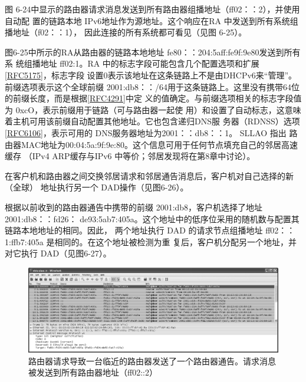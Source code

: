 图 6-24中显示的路由器请求消息发送到所有路由器组播地址（ff02：：2），并使用自动配
置的链路本地 IPv6地址作为源地址。这个响应在RA 中发送到所有系统组播地址（f02：：1），
因此连接的所有系统都可看见（见图 6-25）。

图6-25中所示的RA从路由器的链路本地地址 fe80：：204:5aff:fe9f:9e80发送到所有系
统组播地址 ff02:1。RA
中的标志字段可能包含几个配置选项和扩展\href{https://www.rfc-editor.org/rfc/rfc5175}{\href{https://www.rfc-editor.org/rfc/rfc5175}{[RFC5175]}}，标志字段
设置0表示该地址在这条链路上不是由DHCPv6来“管理”。前缀选项表示这个全球前缀
2001:db8：：/64用于这条链路上。这里没有携带64位的前缀长度，而是根据\href{https://www.rfc-editor.org/rfc/rfc4291}{\href{https://www.rfc-editor.org/rfc/rfc4291}{[RFC4291]}}中定
义的值确定。与前缀选项相关的标志字段值为 0xcO，表示前缀用于链路（可与路由器一起使
用）和设置了自动标志，这意味着主机可用该前缀自动配置其他地址。它也包含递归DNS服
务器（RDNSS）选项\href{https://www.rfc-editor.org/rfc/rfc6106}{\href{https://www.rfc-editor.org/rfc/rfc6106}{[RFC6106]}}，表示可用的
DNS服务器地址为2001：：db8：：1。 SLLAO 指出
路由器MAC地址为00:04:5a:9f:9e:80。这个信息可用于任何节点填充自己的邻居高速缓存
（IPv4 ARP缓存与IPv6 中等价；邻居发现将在第8章中讨论）。

在客户机和路由器之间交换邻居请求和邻居通告消息后，客户机对自己选择的新（全球）
地址执行另一个 DAD操作（见图6-26）。

根据以前收到的路由器通告中携带的前缀 2001:db8，客户机选择了地址 2001:db8：：fd26：
de93:5ab7:405a。这个地址中的低序位采用的随机数与配置其链路本地地址的相同。因此，
两个地址执行 DAD 的请求节点组播地址 ff02：：1:ffb7:405a 是相同的。在这个地址被检测为重
复后，客户机分配另一个地址，并对它执行 DAD（见图6-27）。

\begin{figure}[H]
  \centering
  \includegraphics[scale=0.5]{imgs/6/6-23.png}
  \caption{路由器请求导致一台临近的路由器发送了一个路由器通告。请求消息被发送到所有路由器地址（ff02::2）}
\end{figure}

